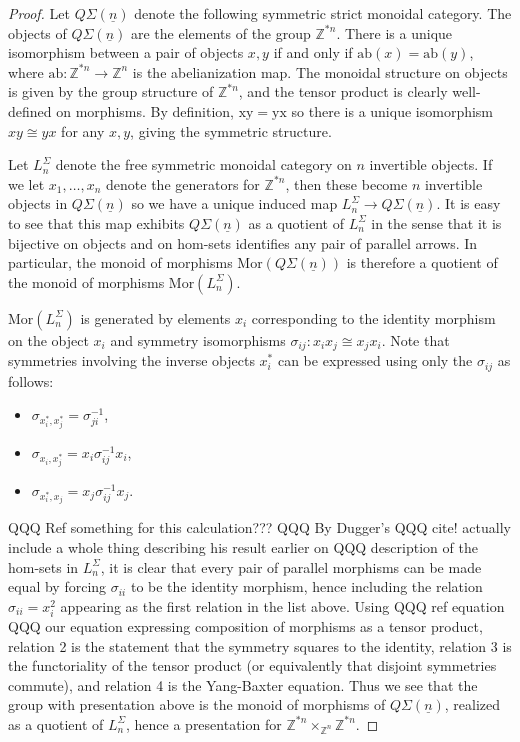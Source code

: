 \documentclass{amsbook} %
\newcommand{\qsn}{Q\Sigma(\underline{n})}
\numberwithin{section}{chapter}
\begin{document}
\begin{proof}
Let $\qsn$ denote the following symmetric strict monoidal category. The objects of $\qsn$ are the elements of the group $\mathbb{Z}^{\ast n}$. There is a unique isomorphism between a pair of objects $x, y$ if and only if $\mathrm{ab}(x) = \mathrm{ab}(y)$, where $\mathrm{ab}: \mathbb{Z}^{\ast n} \to \mathbb{Z}^n$ is the abelianization map. The monoidal structure on objects is given by the group structure of $\mathbb{Z}^{\ast n}$, and the tensor product is clearly well-defined on morphisms. By definition, $\mathrm{xy} = \mathrm{yx}$ so there is a unique isomorphism $xy \cong yx$ for any $x,y$, giving the symmetric structure.

Let $L^{\Sigma}_n$ denote the free symmetric monoidal category on $n$ invertible objects. If we let $x_1, \ldots, x_n$ denote the generators for $\mathbb{Z}^{\ast n}$, then these become $n$ invertible objects in $\qsn$ so we have a unique induced map $L^{\Sigma}_n \to \qsn$. It is easy to see that this map exhibits $\qsn$ as a quotient of $L^{\Sigma}_n$ in the sense that it is bijective on objects and on hom-sets identifies any pair of parallel arrows. In particular, the monoid of morphisms $\mathrm{Mor}(\qsn)$ is therefore a quotient of the monoid of morphisms $\mathrm{Mor}(L^{\Sigma}_n)$.

$\mathrm{Mor}(L^{\Sigma}_n)$ is generated by elements $x_i$ corresponding to the identity morphism on the object $x_i$ and symmetry isomorphisms $\sigma_{ij}:x_i x_j \cong x_j x_i$. Note that symmetries involving the inverse objects $x_i^*$ can be expressed using only the $\sigma_{ij}$ as follows:
\begin{itemize}
\item $\sigma_{x_i^*, x_j^*} = \sigma_{ji}^{-1}$,
\item $\sigma_{x_i, x_j^*} = x_i \sigma_{ij}^{-1} x_i$,
\item $\sigma_{x_i^*, x_j} = x_j \sigma_{ij}^{-1} x_j$.
\end{itemize}
QQQ Ref something for this calculation??? QQQ By Dugger's QQQ cite! actually include a whole thing describing his result earlier on QQQ description of the hom-sets in $L^{\Sigma}_n$, it is clear that every pair of parallel morphisms can be made equal by forcing $\sigma_{ii}$ to be the identity morphism, hence including the relation $\sigma_{ii} = x_i^2$ appearing as the first relation in the list above. Using QQQ ref equation QQQ our equation expressing composition of morphisms as a tensor product, relation 2 is the statement that the symmetry squares to the identity, relation 3 is the functoriality of the tensor product (or equivalently that disjoint symmetries commute), and relation 4 is the Yang-Baxter equation. Thus we see that the group with presentation above is the monoid of morphisms of $\qsn$, realized as a quotient of $L^{\Sigma}_n$, hence a presentation for $\mathbb{Z}^{\ast n} \times_{\mathbb{Z}^n} \mathbb{Z}^{\ast n}$.
\end{proof}
\end{document}
